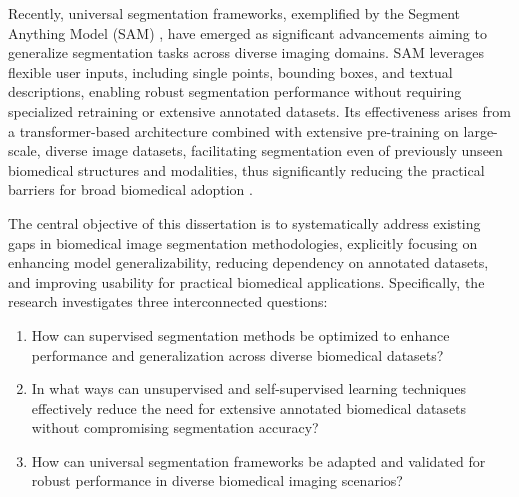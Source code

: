 \documentclass[./dissertation.tex]{subfiles}
\begin{document}
Recently, universal segmentation frameworks, exemplified by the Segment Anything Model (SAM) \cite{kirillov2023segment}, have emerged as significant advancements aiming to generalize segmentation tasks across diverse imaging domains. SAM leverages flexible user inputs, including single points, bounding boxes, and textual descriptions, enabling robust segmentation performance without requiring specialized retraining or extensive annotated datasets. Its effectiveness arises from a transformer-based architecture combined with extensive pre-training on large-scale, diverse image datasets, facilitating segmentation even of previously unseen biomedical structures and modalities, thus significantly reducing the practical barriers for broad biomedical adoption \cite{ma2024segment}.

The central objective of this dissertation is to systematically address existing gaps in biomedical image segmentation methodologies, explicitly focusing on enhancing model generalizability, reducing dependency on annotated datasets, and improving usability for practical biomedical applications. Specifically, the research investigates three interconnected questions:
\begin{enumerate}
    \item How can supervised segmentation methods be optimized to enhance performance and generalization across diverse biomedical datasets?
    \item In what ways can unsupervised and self-supervised learning techniques effectively reduce the need for extensive annotated biomedical datasets without compromising segmentation accuracy?
    \item How can universal segmentation frameworks be adapted and validated for robust performance in diverse biomedical imaging scenarios?
\end{enumerate}

\end{document}
